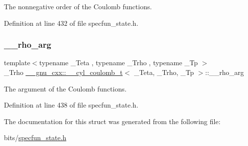 The nonnegative order of the Coulomb functions. 



Definition at line 432 of file specfun\+\_\+state.\+h.

\mbox{\label{struct____gnu__cxx_1_1____cyl__coulomb__t_abbff84a3b281ef7fc6f16245c02b695d}} 
\subsubsection{\texorpdfstring{\+\_\+\+\_\+rho\+\_\+arg}{\_\_rho\_arg}}
{\footnotesize\ttfamily template$<$typename \+\_\+\+Teta , typename \+\_\+\+Trho , typename \+\_\+\+Tp $>$ \\
\+\_\+\+Trho \hyperlink{struct____gnu__cxx_1_1____cyl__coulomb__t}{\+\_\+\+\_\+gnu\+\_\+cxx\+::\+\_\+\+\_\+cyl\+\_\+coulomb\+\_\+t}$<$ \+\_\+\+Teta, \+\_\+\+Trho, \+\_\+\+Tp $>$\+::\+\_\+\+\_\+rho\+\_\+arg}



The argument of the Coulomb functions. 



Definition at line 438 of file specfun\+\_\+state.\+h.



The documentation for this struct was generated from the following file\+:\begin{DoxyCompactItemize}
\item 
bits/\hyperlink{specfun__state_8h}{specfun\+\_\+state.\+h}\end{DoxyCompactItemize}
